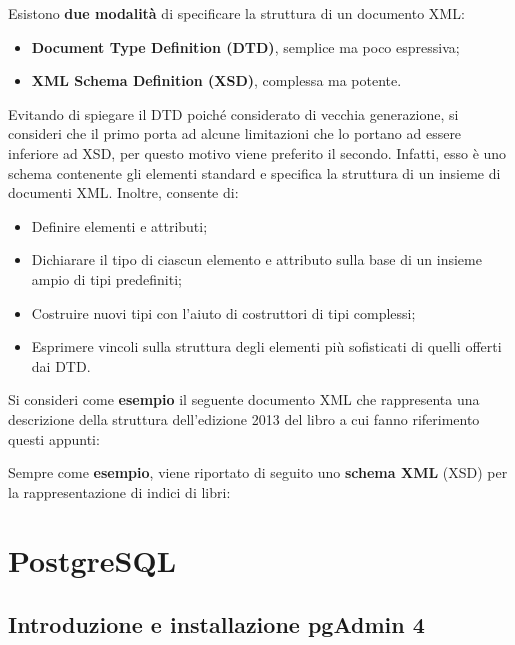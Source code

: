 \documentclass[a4paper]{article}
\begin{document}
	\noindent
	Esistono \textbf{due modalità} di specificare la struttura di un documento XML:
	\begin{itemize}
		\item \textcolor{Red3}{\textbf{Document Type Definition (DTD)}}, semplice ma poco espressiva;
		\item \textcolor{Red3}{\textbf{XML Schema Definition (XSD)}}, complessa ma potente.
	\end{itemize}
	Evitando di spiegare il DTD poiché considerato di vecchia generazione, si consideri che il primo porta ad alcune limitazioni che lo portano ad essere inferiore ad XSD, per questo motivo viene preferito il secondo. Infatti, esso è uno schema contenente gli elementi standard e specifica la struttura di un insieme di documenti XML. Inoltre, consente di:
	\begin{itemize}
		\item Definire elementi e attributi;
		
		\item Dichiarare il tipo di ciascun elemento e attributo sulla base di un insieme ampio di tipi predefiniti;
		
		\item Costruire nuovi tipi con l'aiuto di costruttori di tipi complessi;
		
		\item Esprimere vincoli sulla struttura degli elementi più sofisticati di quelli offerti dai DTD.
	\end{itemize}
	Si consideri come \textcolor{Green4}{\textbf{esempio}} il seguente documento XML che rappresenta una descrizione della struttura dell'edizione 2013 del libro a cui fanno riferimento questi appunti:
	
	Sempre come \textcolor{Green4}{\textbf{esempio}}, viene riportato di seguito uno \textbf{schema XML} (XSD) per la rappresentazione di indici di libri:
	
	
	

	\newpage
	\section{PostgreSQL}
	
	\subsection{Introduzione e installazione pgAdmin 4}
	
\end{document}
